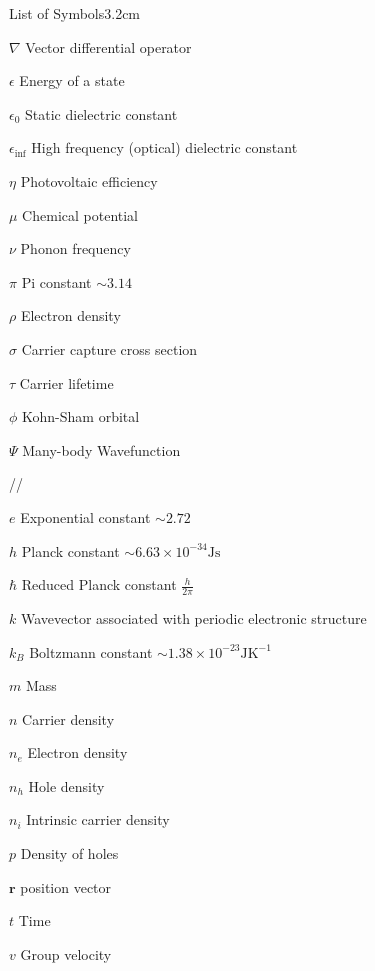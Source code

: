 \begin{mclistof}{List of Symbols}{3.2cm}

\item[$\nabla$] Vector differential operator
\item[$\epsilon$] Energy of a state
\item[$\epsilon_0$] Static dielectric constant
\item[$\epsilon_{\inf}$] High frequency (optical) dielectric constant 
\item[$\eta$] Photovoltaic efficiency
\item[$\mu$] Chemical potential
\item[$\nu$] Phonon frequency
\item[$\pi$] Pi constant $\sim 3.14$
\item[$\rho$] Electron density
\item[$\sigma$] Carrier capture cross section
\item[$\tau$] Carrier lifetime
\item[$\phi$] Kohn-Sham orbital

\item[$\Psi$] Many-body Wavefunction

//

\item[$e$] Exponential constant $\sim 2.72$
\item[$h$] Planck constant $\sim 6.63\times10^{-34}\textrm{Js}$
\item[$\hbar$] Reduced Planck constant $\frac{h}{2\pi}$ 
\item[$k$] Wavevector associated with periodic electronic structure
\item[$k_B$] Boltzmann constant $\sim 1.38\times10^{-23}\textrm{JK}^{-1}$
\item[$m$] Mass   %
\item[$n$] Carrier density
\item[$n_e$] Electron density
\item[$n_h$] Hole density
\item[$n_i$] Intrinsic carrier density
\item[$p$] Density of holes
\item[$\textbf{r}$] position vector
\item[$t$] Time
\item[$v$] Group velocity


\end{mclistof}
